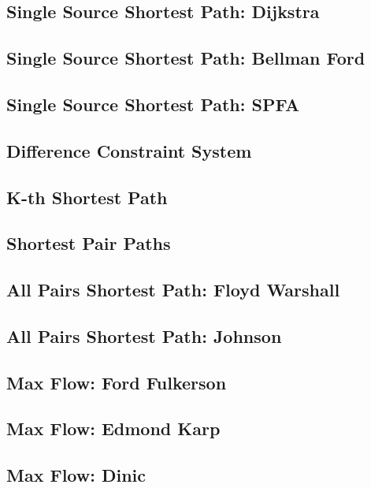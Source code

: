 \documentclass{article}
\begin{document}
    \subsection{Single Source Shortest Path: Dijkstra}
        
    \subsection{Single Source Shortest Path: Bellman Ford}
        
    \subsection{Single Source Shortest Path: SPFA}
        
    \subsection{Difference Constraint System}
    \subsection{K-th Shortest Path}
        
    \subsection{Shortest Pair Paths}
    
    \subsection{All Pairs Shortest Path: Floyd Warshall}
        
    \subsection{All Pairs Shortest Path: Johnson}
        
    \subsection{Max Flow: Ford Fulkerson}
    \subsection{Max Flow: Edmond Karp}
        
    \subsection{Max Flow: Dinic}
        
\end{document}
